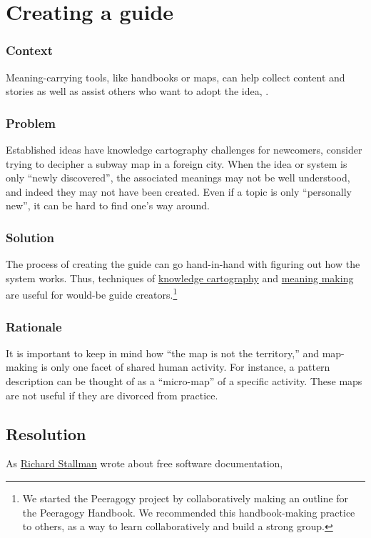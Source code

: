 \section{Creating a guide}\label{sec:Creating_a_guide}
\subsubsection*{Context} Meaning-carrying tools, like handbooks or maps, can help collect content and stories as well as assist others who want to adopt the idea, .

\subsubsection*{Problem} 
Established ideas have knowledge cartography challenges for newcomers, consider trying to decipher a subway map in a foreign city. When the idea or system is only ``newly discovered'', the associated meanings may not be well understood, and indeed they may not have been created. Even if a topic is only ``personally new'', it can be hard to find one's way around.

\subsubsection*{Solution}
The process of creating the guide can go hand-in-hand with figuring out how the system works. Thus, techniques of \href{http://knowledgecartography.org/}{knowledge cartography} and \href{http://www.hitl.washington.edu/publications/r-97-47/two.html}{meaning making} are useful for would-be guide creators.\footnote{We started the Peeragogy project by collaboratively making an outline for the Peeragogy Handbook. We recommended this
handbook-making practice to others, as a way to learn collaboratively and build a strong group.}

\subsubsection*{Rationale} 
It is important to keep in mind how ``the map is not the territory,'' and map-making is only one facet of shared human activity. For instance, a pattern description can be thought of as a ``micro-map'' of a specific activity. These maps are not useful if they are divorced from practice.

\subsection*{Resolution}
As \href{https://www.gnu.org/philosophy/free-doc.html}{Richard Stallman} wrote about free software documentation, 

